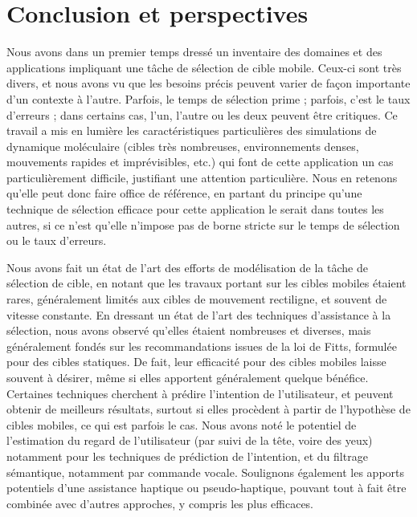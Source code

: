 


\chapter*{Conclusion et perspectives}
\mtcaddchapter %


	Nous avons dans un premier temps dressé un inventaire des domaines et des applications impliquant une tâche de sélection de cible mobile. Ceux-ci sont très divers, et nous avons vu que les besoins précis peuvent varier de façon importante d'un contexte à l'autre. Parfois, le temps de sélection prime ; parfois, c'est le taux d'erreurs ; dans certains cas, l'un, l'autre ou les deux peuvent être critiques. Ce travail a mis en lumière les caractéristiques particulières des simulations de dynamique moléculaire (cibles très nombreuses, environnements denses, mouvements rapides et imprévisibles, etc.) qui font de cette application un cas particulièrement difficile, justifiant une attention particulière. Nous en retenons qu'elle peut donc faire office de référence, en partant du principe qu'une technique de sélection efficace pour cette application le serait dans toutes les autres, si ce n'est qu'elle n'impose pas de borne stricte sur le temps de sélection ou le taux d'erreurs.
	
	Nous avons fait un état de l'art des efforts de modélisation de la tâche de sélection de cible, en notant que les travaux portant sur les cibles mobiles étaient rares, généralement limités aux cibles de mouvement rectiligne, et souvent de vitesse constante. En dressant un état de l'art des techniques d'assistance à la sélection, nous avons observé qu'elles étaient nombreuses et diverses, mais généralement fondés sur les recommandations issues de la loi de Fitts, formulée pour des cibles statiques. De fait, leur efficacité pour des cibles mobiles laisse souvent à désirer, même si elles apportent généralement quelque bénéfice. Certaines techniques cherchent à prédire l'intention de l'utilisateur, et peuvent obtenir de meilleurs résultats, surtout si elles procèdent à partir de l'hypothèse de cibles mobiles, ce qui est parfois le cas. Nous avons noté le potentiel de l'estimation du regard de l'utilisateur (par suivi de la tête, voire des yeux) notamment pour les techniques de prédiction de l'intention, et du filtrage sémantique, notamment par commande vocale. Soulignons également les apports potentiels d'une assistance haptique ou pseudo-haptique, pouvant tout à fait être combinée avec d'autres approches, y compris les plus efficaces.
	
	